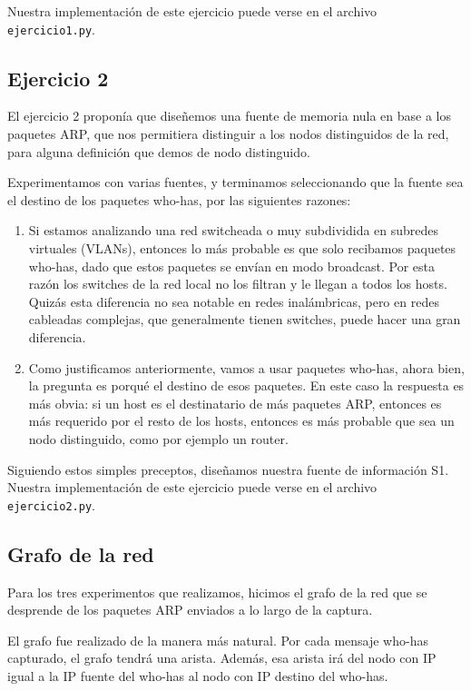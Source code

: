 Nuestra implementación de este ejercicio puede verse en el archivo \texttt{ejercicio1.py}.


\subsection{Ejercicio 2}

El ejercicio 2 proponía que diseñemos una fuente de memoria nula en base a los paquetes ARP, que nos permitiera distinguir a los nodos distinguidos de la red, para alguna definición que demos de nodo distinguido.

Experimentamos con varias fuentes, y terminamos seleccionando que la fuente sea el destino de los paquetes who-has, por las siguientes razones:

\begin{enumerate}
  \item Si estamos analizando una red switcheada o muy subdividida en subredes virtuales (VLANs), entonces lo más probable es que solo recibamos paquetes who-has, dado que estos paquetes se envían en modo broadcast.
    Por esta razón los switches de la red local no los filtran y le llegan a todos los hosts.  Quizás esta diferencia no sea notable en redes inalámbricas, pero en redes cableadas complejas, que generalmente tienen switches, puede hacer una gran diferencia.
  \item Como justificamos anteriormente, vamos a usar paquetes who-has, ahora bien, la pregunta es porqu\'e el destino de esos paquetes. En este caso la respuesta es más obvia: si un host es el destinatario de más paquetes ARP, entonces es más requerido por el resto de los hosts, entonces es más probable que sea un nodo distinguido, como por ejemplo un router.
\end{enumerate}

Siguiendo estos simples preceptos, diseñamos nuestra fuente de información S1. Nuestra implementación de este ejercicio puede verse en el archivo \texttt{ejercicio2.py}.

\subsection{Grafo de la red}

Para los tres experimentos que realizamos, hicimos el grafo de la red que se desprende de los paquetes ARP enviados a lo largo de la captura.

El grafo fue realizado de la manera más natural. Por cada mensaje who-has capturado, el grafo tendrá una arista. Además, esa arista irá del nodo con IP igual a la IP fuente del who-has al nodo con IP destino del who-has.

